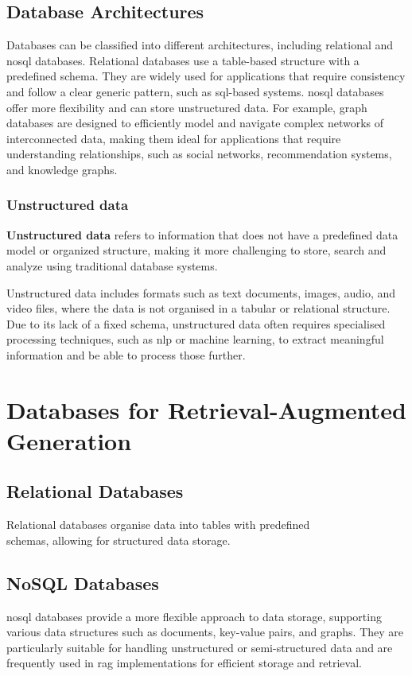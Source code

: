\subsection{Database Architectures}\label{sec:database-architectures}
Databases can be classified into different architectures, including relational and \ac{nosql} databases. 
Relational databases use a table-based structure with a predefined schema. 
They are widely used for applications that require consistency and follow a clear generic pattern, such as \ac{sql}-based systems.
\ac{nosql} databases offer more flexibility and can store unstructured data. 
For example, graph databases are designed to efficiently model and navigate complex networks of interconnected data, making them ideal for applications that require understanding relationships, such as social networks, recommendation systems, and knowledge graphs.
\subsubsection{Unstructured data}\label{sec:unstructured-data}
\begin{definition}\label{def:unstructured-data}
    \textbf{Unstructured data} refers to information that does not have a predefined data model or organized structure, making it more challenging to store, search and analyze using traditional database systems.
\end{definition}
Unstructured data includes formats such as text documents, images, audio, and video files, where the data is not organised in a tabular or relational structure. 
Due to its lack of a fixed schema, unstructured data often requires specialised processing techniques, such as \ac{nlp} or machine learning, to extract meaningful information and be able to process those further.
\section{Databases for Retrieval-Augmented Generation}\label{sec:databases-rag}

\subsection{Relational Databases}\label{sec:relational-databases}
Relational databases organise data into tables with predefined\\ schemas, allowing for structured data storage. 

\subsection{NoSQL Databases}\label{sec:nosql-databases}
\ac{nosql} databases provide a more flexible approach to data storage, supporting various data structures such as documents, key-value pairs, and graphs. 
They are particularly suitable for handling unstructured or semi-structured data and are frequently used in \ac{rag} implementations for efficient storage and retrieval.

